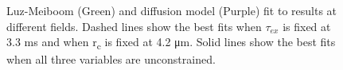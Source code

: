 \begin{figure}[t]

  \caption[Luz-Meiboom and diffusion model fits at different fields]{Luz-Meiboom (Green) and diffusion model (Purple) fit to \Ttwo results at different fields. Dashed lines show the best fits when $\tau_{ex}$ is fixed at 3.3 ms and when r\textsubscript{c} is fixed at 4.2 μm. Solid lines show the best fits when all three variables are unconstrained.}
  \label{fig:dm-fitResults}
\end{figure}


